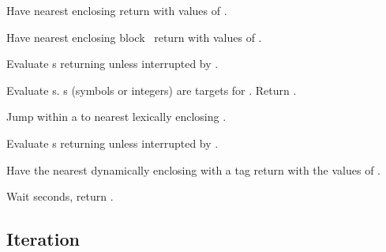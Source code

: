 \begin{LIST}{1cm}
  {
  Have nearest enclosing   return with
  values of . 
  }

  {
  Have nearest enclosing block \NIL\ return with values of .
  }

  {Evaluate s returning
   unless interrupted by .
  }

  {
  Evaluate s. s (symbols or integers) are targets
  for . Return \retval{\NIL}. 
  }

  {Jump within a  to nearest
  lexically enclosing  .
  }

  {Evaluate s returning
   unless interrupted by .
  }

  {Have the nearest dynamically
  enclosing  with a tag   return with the
  values of .
  }

  {Wait  seconds, return \retval{\NIL}.
    }

\end{LIST}



\subsection{Iteration}

